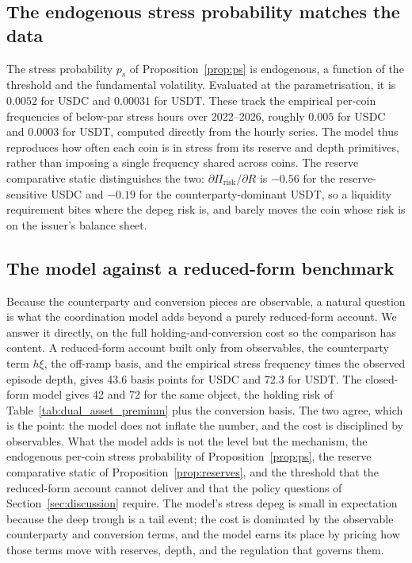 \subsection{The endogenous stress probability matches the data}\label{sub:ps_validation}

The stress probability $p_s$ of Proposition~\ref{prop:ps} is endogenous, a function of the threshold and the fundamental volatility. Evaluated at the parametrisation, it is $0.0052$ for USDC and $0.00031$ for USDT. These track the empirical per-coin frequencies of below-par stress hours over 2022--2026, roughly $0.005$ for USDC and $0.0003$ for USDT, computed directly from the hourly series. The model thus reproduces how often each coin is in stress from its reserve and depth primitives, rather than imposing a single frequency shared across coins. The reserve comparative static distinguishes the two: $\partial \Pi_{\text{risk}}/\partial R$ is $-0.56$ for the reserve-sensitive USDC and $-0.19$ for the counterparty-dominant USDT, so a liquidity requirement bites where the depeg risk is, and barely moves the coin whose risk is on the issuer's balance sheet.

\subsection{The model against a reduced-form benchmark}\label{sub:interp}

Because the counterparty and conversion pieces are observable, a natural question is what the coordination model adds beyond a purely reduced-form account. We answer it directly, on the full holding-and-conversion cost so the comparison has content. A reduced-form account built only from observables, the counterparty term $h\xi$, the off-ramp basis, and the empirical stress frequency times the observed episode depth, gives 43.6 basis points for USDC and 72.3 for USDT. The closed-form model gives 42 and 72 for the same object, the holding risk of Table~\ref{tab:dual_asset_premium} plus the conversion basis. The two agree, which is the point: the model does not inflate the number, and the cost is disciplined by observables. What the model adds is not the level but the mechanism, the endogenous per-coin stress probability of Proposition~\ref{prop:ps}, the reserve comparative static of Proposition~\ref{prop:reserves}, and the threshold that the reduced-form account cannot deliver and that the policy questions of Section~\ref{sec:discussion} require. The model's stress depeg is small in expectation because the deep trough is a tail event; the cost is dominated by the observable counterparty and conversion terms, and the model earns its place by pricing how those terms move with reserves, depth, and the regulation that governs them.
